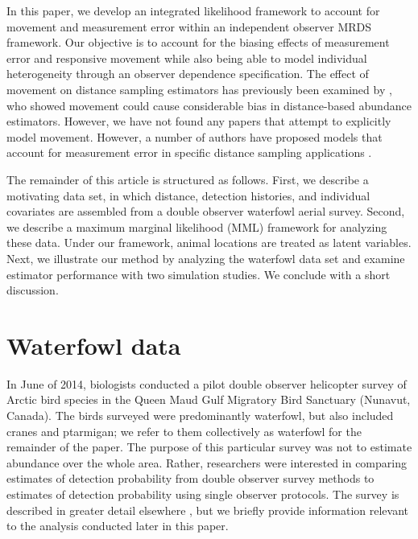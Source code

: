 \documentclass[12pt,fleqn]{article}
\begin{document}
In this paper, we develop an integrated likelihood framework to account for movement and measurement error within an independent observer MRDS framework.  Our objective is to account for the biasing effects of measurement error and responsive movement while also being able to model individual heterogeneity through an observer dependence specification.  The effect of movement on distance sampling estimators has previously been examined by \citet{GlennieEtAl2015}, who showed movement could cause considerable bias in distance-based abundance estimators.  However, we have not found any papers that attempt to explicitly model movement.  However, a number of authors have proposed models that account for measurement error in specific distance sampling applications \citep[see e.g.][and references therein]{BorchersEtAl2010}.

The remainder of this article is structured as follows.  First, we describe a motivating data set, in which distance, detection histories, and individual covariates are assembled from a double observer waterfowl aerial survey.  Second, we describe a maximum marginal likelihood (MML) framework for analyzing these data.  Under our framework, animal locations are treated as latent variables.  Next, we illustrate our method by analyzing the waterfowl data set and examine estimator performance with two simulation studies.  We conclude with a short discussion.


\section{Waterfowl data}

In June of 2014, biologists conducted a pilot double observer helicopter survey of Arctic bird species in the Queen Maud Gulf Migratory Bird Sanctuary (Nunavut, Canada). The birds surveyed were predominantly waterfowl, but also included cranes and ptarmigan; we refer to them collectively as waterfowl for the remainder of the paper. The purpose of this particular survey was not to estimate abundance over the whole area. Rather, researchers were interested in comparing estimates of detection probability from double observer survey methods to estimates of detection probability using single observer protocols.
The survey is described in greater detail elsewhere \citep{AlisauskasConn2017}, but we briefly provide information relevant to the analysis conducted later in this paper.
\end{document}
